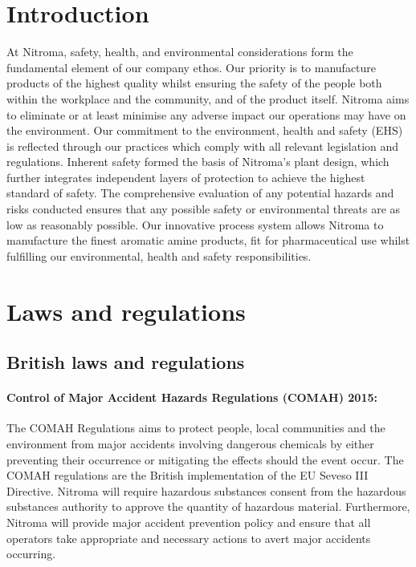 \section{Introduction}

At Nitroma, safety, health, and environmental considerations form the fundamental element of our company ethos. Our priority is to manufacture products of the highest quality whilst ensuring the safety of the people both within the workplace and the community, and of the product itself. Nitroma aims to eliminate or at least minimise any adverse impact our operations may have on the environment. Our commitment to the environment, health and safety (EHS) is reflected through our practices which comply with all relevant legislation and regulations. Inherent safety formed the basis of Nitroma’s plant design, which further integrates independent layers of protection to achieve the highest standard of safety. The comprehensive evaluation of any potential hazards and risks conducted ensures that any possible safety or environmental threats are as low as reasonably possible. Our innovative process system allows Nitroma to manufacture the finest aromatic amine products, fit for pharmaceutical use whilst fulfilling our environmental, health and safety responsibilities.

\section{Laws and regulations}
\subsection{British laws and regulations}

\paragraph{Control of Major Accident Hazards Regulations (COMAH) 2015:} 

The COMAH Regulations aims to protect people, local communities and the environment from major accidents involving dangerous chemicals by either preventing their occurrence or mitigating the effects should the event occur. The COMAH regulations are the British implementation of the EU Seveso III Directive. Nitroma will require hazardous substances consent from the hazardous substances authority to approve the quantity of hazardous material. Furthermore, Nitroma will provide major accident prevention policy and ensure that all operators take appropriate and necessary actions to avert major accidents occurring. 


